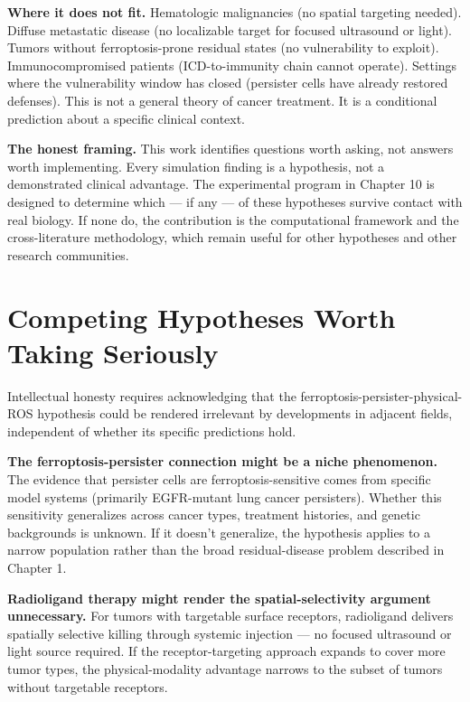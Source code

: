\documentclass[11pt,twoside,openright]{report}
\begin{document}
\textbf{Where it does not fit.} Hematologic malignancies (no spatial targeting needed). Diffuse metastatic disease (no localizable target for focused ultrasound or light). Tumors without ferroptosis-prone residual states (no vulnerability to exploit). Immunocompromised patients (ICD-to-immunity chain cannot operate). Settings where the vulnerability window has closed (persister cells have already restored defenses). This is not a general theory of cancer treatment. It is a conditional prediction about a specific clinical context.

\textbf{The honest framing.} This work identifies questions worth asking, not answers worth implementing. Every simulation finding is a hypothesis, not a demonstrated clinical advantage. The experimental program in Chapter 10 is designed to determine which --- if any --- of these hypotheses survive contact with real biology. If none do, the contribution is the computational framework and the cross-literature methodology, which remain useful for other hypotheses and other research communities.

\section{Competing Hypotheses Worth Taking Seriously}

Intellectual honesty requires acknowledging that the ferroptosis-persister-physical-ROS hypothesis could be rendered irrelevant by developments in adjacent fields, independent of whether its specific predictions hold.

\textbf{The ferroptosis-persister connection might be a niche phenomenon.} The evidence that persister cells are ferroptosis-sensitive comes from specific model systems (primarily EGFR-mutant lung cancer persisters). Whether this sensitivity generalizes across cancer types, treatment histories, and genetic backgrounds is unknown. If it doesn't generalize, the hypothesis applies to a narrow population rather than the broad residual-disease problem described in Chapter 1.

\textbf{Radioligand therapy might render the spatial-selectivity argument unnecessary.} For tumors with targetable surface receptors, radioligand delivers spatially selective killing through systemic injection --- no focused ultrasound or light source required. If the receptor-targeting approach expands to cover more tumor types, the physical-modality advantage narrows to the subset of tumors without targetable receptors.
\end{document}
